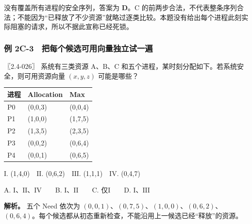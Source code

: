 没有覆盖所有进程的安全序列，答案为 \textbf{D}。C 的前两步合法，不代表整条序列合法；不能因为``已释放了不少资源''就略过逐类比较。本题没有给出每个进程此刻实际阻塞的请求，所以不据此宣称已经死锁。

\subsubsection{例 2C-3　把每个候选可用向量独立试一遍}\label{OS02-ex4-3}

\begin{example}[配套例题]

〖2.4-026〗 系统有三类资源 A、B、C 和五个进程，某时刻分配如下。若系统安全，则可用资源向量 \((x,y,z)\) 可能是哪些？

\begin{wideblock}

\par\medskip\noindent\begin{minipage}{\linewidth}\fontsize{9.3}{12}\selectfont\begin{tabularx}{\linewidth}{@{}YYY@{}}
\toprule\noalign{}
进程 & Allocation & Max \\
\midrule\noalign{}


P0 & (0,0,3) & (0,0,4) \\
P1 & (1,0,0) & (1,7,5) \\
P2 & (1,3,5) & (2,3,5) \\
P3 & (0,0,2) & (0,6,4) \\
P4 & (0,0,1) & (0,6,5) \\
\bottomrule\end{tabularx}
\end{minipage}\par\medskip

\end{wideblock}

\ensuremath{\mathrm{I}}. (1,4,0)　\ensuremath{\mathrm{II}}. (0,6,2)　\ensuremath{\mathrm{III}}. (1,1,1)　\ensuremath{\mathrm{IV}}. (0,4,7)

A. \ensuremath{\mathrm{I}}、\ensuremath{\mathrm{II}}、\ensuremath{\mathrm{IV}}　　B. \ensuremath{\mathrm{I}}、\ensuremath{\mathrm{II}}　　C. 仅\ensuremath{\mathrm{I}}　　D. \ensuremath{\mathrm{I}}、\ensuremath{\mathrm{III}}

\end{example}

\textbf{解析。} 五个 Need 依次为 \((0,0,1)\)、\((0,7,5)\)、\((1,0,0)\)、\((0,6,2)\)、\((0,6,4)\)。每个候选都从初态重新检查，不能沿用上一候选已经``释放''的资源。

